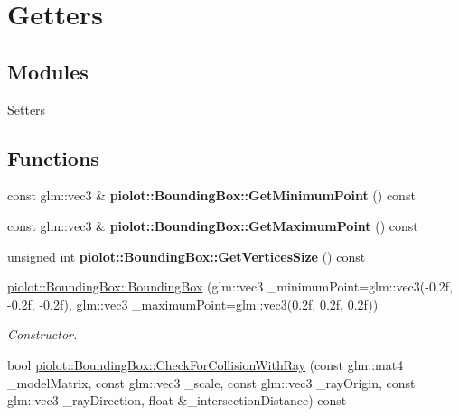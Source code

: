 \hypertarget{group___getters}{}\section{Getters}
\label{group___getters}
\subsection*{Modules}
\begin{DoxyCompactItemize}
\item 
\mbox{\hyperlink{group___setters}{Setters}}
\end{DoxyCompactItemize}
\subsection*{Functions}
\begin{DoxyCompactItemize}
\item 
\mbox{\label{group___getters_ga1534921bb22645320614b4cf02268906}} 
const glm\+::vec3 \& {\bfseries piolot\+::\+Bounding\+Box\+::\+Get\+Minimum\+Point} () const
\item 
\mbox{\label{group___getters_gafd9222c8fb47c5484c873ace9d66a37d}} 
const glm\+::vec3 \& {\bfseries piolot\+::\+Bounding\+Box\+::\+Get\+Maximum\+Point} () const
\item 
\mbox{\label{group___getters_ga57651f343f21133fc6c89c8c5619ed84}} 
unsigned int {\bfseries piolot\+::\+Bounding\+Box\+::\+Get\+Vertices\+Size} () const
\item 
\mbox{\hyperlink{group___getters_ga699e27e8e646be7a0a47f89abb35778d}{piolot\+::\+Bounding\+Box\+::\+Bounding\+Box}} (glm\+::vec3 \+\_\+minimum\+Point=glm\+::vec3(-\/0.\+2f, -\/0.\+2f, -\/0.\+2f), glm\+::vec3 \+\_\+maximum\+Point=glm\+::vec3(0.\+2f, 0.\+2f, 0.\+2f))
\begin{DoxyCompactList}\small\item\em Constructor. \end{DoxyCompactList}\item 
bool \mbox{\hyperlink{group___getters_ga552fcdb461cdc71c5da0fed7b486246d}{piolot\+::\+Bounding\+Box\+::\+Check\+For\+Collision\+With\+Ray}} (const glm\+::mat4 \+\_\+model\+Matrix, const glm\+::vec3 \+\_\+scale, const glm\+::vec3 \+\_\+ray\+Origin, const glm\+::vec3 \+\_\+ray\+Direction, float \&\+\_\+intersection\+Distance) const

\end{DoxyCompactItemize}
